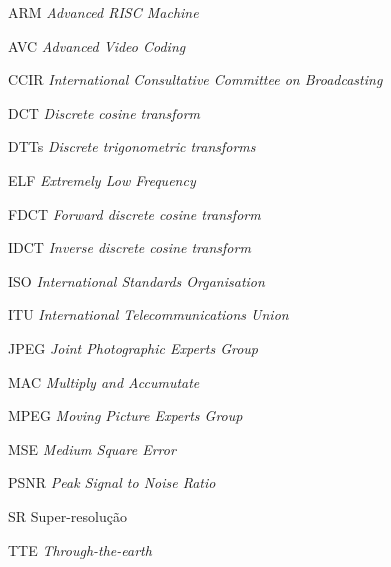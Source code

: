 \begin{siglas}
  \item[ARM] \textit{Advanced RISC Machine}
  \item[AVC] \textit{Advanced Video Coding}
  \item[CCIR] \textit{International Consultative Committee on Broadcasting}
  \item[DCT] \textit{Discrete cosine transform}
  \item[DTTs] \textit{Discrete trigonometric transforms}
  \item[ELF] \textit{Extremely Low Frequency}
  \item[FDCT] \textit{Forward discrete cosine transform} 
  \item[IDCT] \textit{Inverse discrete cosine transform}
  \item[ISO] \textit{International Standards Organisation} 
  \item[ITU] \textit{International Telecommunications Union}
  \item[JPEG] \textit{Joint Photographic Experts Group}
  \item[MAC] \textit{Multiply and Accumutate}
  \item[MPEG] \textit{Moving Picture Experts Group}
  \item[MSE] \textit{Medium Square Error}
  \item[PSNR] \textit{Peak Signal to Noise Ratio}
  \item[SR] Super-resolução
  \item[TTE] \textit{Through-the-earth}
\end{siglas}
